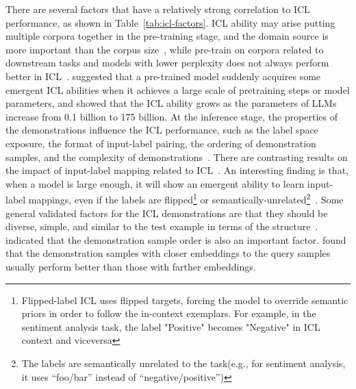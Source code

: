 There are several factors that have a relatively strong correlation to ICL performance, as shown in Table~\ref{tab:icl-factors}.
ICL ability may arise putting multiple corpora together in the pre-training stage, and the domain source is more important than the corpus size~\cite{shin2022effect}, while pre-train on corpora related to downstream tasks and models with lower perplexity does not always perform better in ICL~\cite{shin2022effect}.
\textcite{wei2022emergent} suggested that a pre-trained model suddenly acquires some emergent ICL abilities when it achieves a large scale of pretraining steps or model parameters, and \textcite{brown2020language} showed that the ICL ability grows as the parameters of LLMs increase from 0.1 billion to 175 billion.
At the inference stage, the properties of the demonstrations influence the ICL performance, such as the label space exposure, the format of input-label pairing, the ordering of demonstration samples, and the complexity of demonstrations~\cite{min2022rethinking, an2023how, lu2022fantastically}.
There are contrasting results on the impact of input-label mapping related to ICL~\cite{min2022rethinking, yoo2022groundtruth}.
An interesting finding is that, when a model is large enough, it will show an emergent ability to learn input-label mappings, even if the labels are flipped\footnote{Flipped-label ICL uses flipped targets, forcing the model to override semantic priors in order to follow the in-context exemplars. For example, in the sentiment analysis task, the label "Positive" becomes "Negative" in ICL context and viceversa} or semantically-unrelated\footnote{The labels are semantically unrelated to the task(e.g., for sentiment analysis, it uses “foo/bar” instead of “negative/positive”)}~\cite{wei2023larger}.
Some general validated factors for the ICL demonstrations are that they should be diverse, simple, and similar to the test example in terms of the structure~\cite{an2023how}.
\textcite{lu2022fantastically} indicated that the demonstration sample order is also an important factor.
\textcite{liu2022good} found that the demonstration samples with closer embeddings to the query samples usually perform better than those with farther embeddings.

